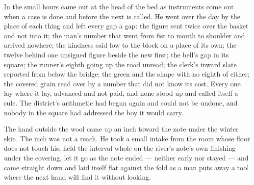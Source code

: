In the small hours  came out at the head of the bed as instruments come out when a case is done and before the next is called. He went over the day by the place of each thing and left every gap a gap: the figure sent twice over the basket and not into it; the man's number that went from fist to mouth to shoulder and arrived nowhere; the kindness said low to the block on a place of its own; the twelve behind one unsigned figure beside the new first; the bell's gap in its square; the runner's eighth going up the road unread; the clerk's inward slate reported from below the bridge; the green and the shape with no eighth of either; the covered grain read over by a number that did not know its cost. Every one lay where it lay, advanced and not paid, and none stood up and called itself a rule. The district's arithmetic had begun again and could not be undone, and nobody in the square had addressed the boy it would carry.

The hand outside the wool came up an inch toward the note under the winter skin. The inch was not a reach. He took a small intake from the room whose floor does not touch his, held the interval whole on the river's note's own finishing under the covering, let it go as the note ended --- neither early nor stayed --- and came straight down and laid itself flat against the fold as a man puts away a tool where the next hand will find it without looking.

